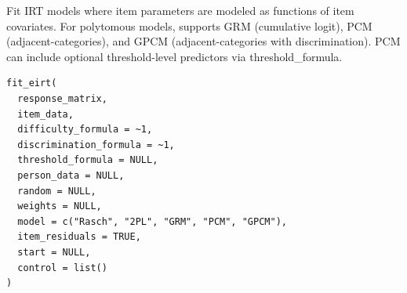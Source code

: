 \documentclass[a4paper]{book}
\begin{document}
%
\begin{Description}
Fit IRT models where item parameters are modeled as functions of item covariates.
For polytomous models, supports GRM (cumulative logit), PCM (adjacent-categories),
and GPCM (adjacent-categories with discrimination). PCM can include optional
threshold-level predictors via threshold\_formula.
\end{Description}
%
\begin{Usage}
\begin{verbatim}
fit_eirt(
  response_matrix,
  item_data,
  difficulty_formula = ~1,
  discrimination_formula = ~1,
  threshold_formula = NULL,
  person_data = NULL,
  random = NULL,
  weights = NULL,
  model = c("Rasch", "2PL", "GRM", "PCM", "GPCM"),
  item_residuals = TRUE,
  start = NULL,
  control = list()
)
\end{verbatim}
\end{Usage}
%
\end{document}
